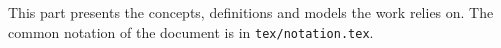 
This part presents the concepts, definitions and models the work relies on.
The common notation of the document is in \texttt{tex/notation.tex}.
